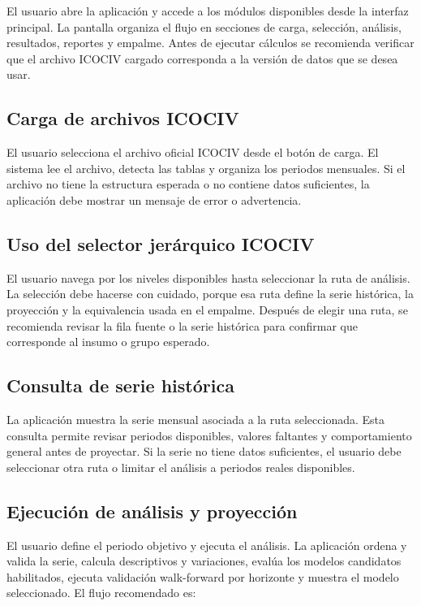 \documentclass[12pt,letterpaper]{article}
\newcommand{\ICOCIV}{ICOCIV}
\begin{document}
El usuario abre la aplicación y accede a los módulos disponibles desde la interfaz principal. La pantalla organiza el flujo en secciones de carga, selección, análisis, resultados, reportes y empalme. Antes de ejecutar cálculos se recomienda verificar que el archivo \ICOCIV{} cargado corresponda a la versión de datos que se desea usar.

\subsection{Carga de archivos ICOCIV}

El usuario selecciona el archivo oficial \ICOCIV{} desde el botón de carga. El sistema lee el archivo, detecta las tablas y organiza los periodos mensuales. Si el archivo no tiene la estructura esperada o no contiene datos suficientes, la aplicación debe mostrar un mensaje de error o advertencia.

\subsection{Uso del selector jerárquico ICOCIV}

El usuario navega por los niveles disponibles hasta seleccionar la ruta de análisis. La selección debe hacerse con cuidado, porque esa ruta define la serie histórica, la proyección y la equivalencia usada en el empalme. Después de elegir una ruta, se recomienda revisar la fila fuente o la serie histórica para confirmar que corresponde al insumo o grupo esperado.

\subsection{Consulta de serie histórica}

La aplicación muestra la serie mensual asociada a la ruta seleccionada. Esta consulta permite revisar periodos disponibles, valores faltantes y comportamiento general antes de proyectar. Si la serie no tiene datos suficientes, el usuario debe seleccionar otra ruta o limitar el análisis a periodos reales disponibles.

\subsection{Ejecución de análisis y proyección}

El usuario define el periodo objetivo y ejecuta el análisis. La aplicación ordena y valida la serie, calcula descriptivos y variaciones, evalúa los modelos candidatos habilitados, ejecuta validación walk-forward por horizonte y muestra el modelo seleccionado. El flujo recomendado es:
\end{document}
